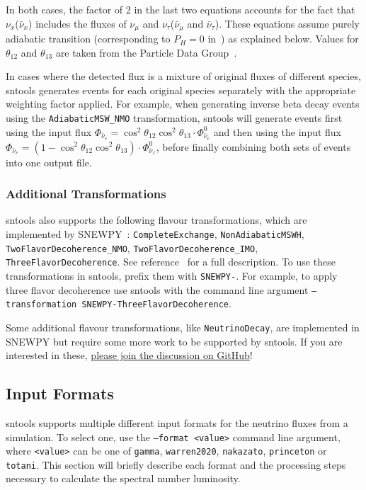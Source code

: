 \documentclass[11pt, oneside]{article}
\newcommand{\numu}{\ensuremath{\nu_\mu}\xspace}
\newcommand{\nutau}{\ensuremath{\nu_\tau}\xspace}
\newcommand{\nux}{\ensuremath{\nu_x}\xspace}
\newcommand{\nuebar}{\ensuremath{\bar{\nu}_e}\xspace}
\newcommand{\numubar}{\ensuremath{\bar{\nu}_\mu}\xspace}
\newcommand{\nutaubar}{\ensuremath{\bar{\nu}_\tau}\xspace}
\newcommand{\nuxbar}{\ensuremath{\bar{\nu}_x}\xspace}
\begin{document}
In both cases, the factor of 2 in the last two equations accounts for the fact that \nux (\nuxbar) includes the fluxes of \numu and \nutau (\numubar and \nutaubar).
These equations assume purely adiabatic transition (corresponding to $P_H = 0$ in~\cite{Dighe2000,Fogli2005}) as explained below.
Values for $\theta_{12}$ and $\theta_{13}$ are taken from the Particle Data Group~\cite{PDG2020}.

In cases where the detected flux is a mixture of original fluxes of different species, sntools generates events for each original species separately with the appropriate weighting factor applied.
For example, when generating inverse beta decay events using the \texttt{AdiabaticMSW\_NMO} transformation, sntools will generate events first using the input flux $\Phi_{\nuebar} = \cos^2 \theta_{12} \cos^2 \theta_{13} \cdot \Phi^0_{\nuebar}$ and then using the input flux $\Phi_{\nuebar} = (1 - \cos^2 \theta_{12} \cos^2 \theta_{13}) \cdot \Phi^0_{\nuxbar}$, before finally combining both sets of events into one output file.

\subsubsection{Additional Transformations}
sntools also supports the following flavour transformations, which are implemented by SNEWPY~\cite{Baxter2021}:
\texttt{CompleteExchange},
\texttt{NonAdiabaticMSWH},
\texttt{TwoFlavorDecoherence\_NMO},
\texttt{TwoFlavorDecoherence\_IMO},
\texttt{ThreeFlavorDecoherence}.
See reference~\cite{SNEWS:2021ezc} for a full description.
To use these transformations in sntools, prefix them with \texttt{SNEWPY-}. For example, to apply three flavor decoherence use sntools with the command line argument \texttt{--transformation SNEWPY-ThreeFlavorDecoherence}.

Some additional flavour transformations, like \texttt{NeutrinoDecay}, are implemented in SNEWPY but require some more work to be supported by sntools. If you are interested in these, \href{https://github.com/JostMigenda/sntools/issues/28}{please join the discussion on GitHub}!


\subsection{Input Formats} \label{sec:input-formats}
sntools supports multiple different input formats for the neutrino fluxes from a simulation.
To select one, use the \texttt{--format <value>} command line argument, where \texttt{<value>} can be one of \texttt{gamma}, \texttt{warren2020}, \texttt{nakazato}, \texttt{princeton} or \texttt{totani}.
This section will briefly describe each format and the processing steps necessary to calculate the spectral number luminosity.
\end{document}

